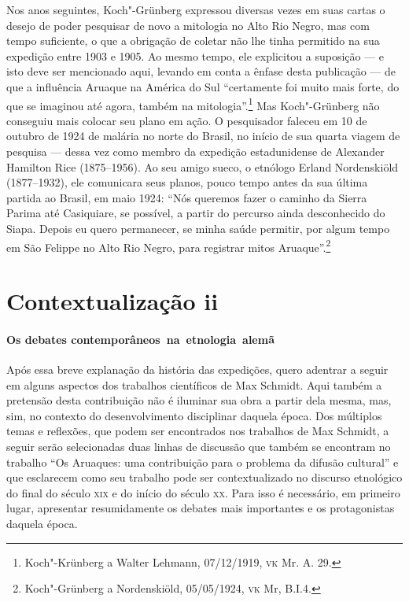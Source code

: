 Nos anos seguintes, Koch"-Grünberg expressou diversas vezes em suas
cartas o desejo de poder pesquisar de novo a mitologia no Alto Rio
Negro, mas com tempo suficiente, o que a obrigação de coletar não lhe
tinha permitido na sua expedição entre 1903 e 1905. Ao mesmo tempo, ele
explicitou a suposição --- e isto deve ser mencionado aqui, levando em
conta a ênfase desta publicação --- de que a influência Aruaque na
América do Sul ``certamente foi muito mais forte, do que se imaginou até
agora, também na mitologia''.\footnote{Koch"-Krünberg a Walter Lehmann,
  07/12/1919, \textsc{vk} Mr. A. 29.} Mas Koch"-Grünberg não conseguiu mais
colocar seu plano em ação. O pesquisador faleceu em 10 de outubro de
1924 de malária no norte do Brasil, no início de sua quarta viagem de
pesquisa --- dessa vez como membro da expedição estadunidense de
Alexander Hamilton Rice (1875--1956). Ao seu amigo sueco, o etnólogo
Erland Nordenskiöld (1877--1932), ele comunicara seus planos, pouco tempo
antes da sua última partida ao Brasil, em maio 1924: ``Nós queremos
fazer o caminho da Sierra Parima até Casiquiare, se possível, a partir
do percurso ainda desconhecido do Siapa. Depois eu quero permanecer, se
minha saúde permitir, por algum tempo em São Felippe no Alto Rio Negro,
para registrar mitos Aruaque''.\footnote{Koch"-Grünberg a Nordenskiöld,
  05/05/1924, \textsc{vk} Mr, B.I.4.}

\section{Contextualização ii}

\paragraph{Os debates contemporâneos~na~etnologia~alemã} Após essa breve explanação da história das expedições, quero adentrar a
seguir em alguns aspectos dos trabalhos científicos de Max Schmidt.
Aqui também a pretensão desta contribuição não é iluminar sua obra a
partir dela mesma, mas, sim, no contexto do desenvolvimento disciplinar
daquela época. Dos múltiplos temas e reflexões, que podem ser
encontrados nos trabalhos de Max Schmidt, a seguir serão selecionadas
duas linhas de discussão que também se encontram no trabalho ``Os
Aruaques: uma contribuição para o problema da difusão cultural'' e que
esclarecem como seu trabalho pode ser contextualizado no discurso
etnológico do final do século \textsc{xix} e do início do século \textsc{xx}. Para isso é
necessário, em primeiro lugar, apresentar resumidamente os debates mais
importantes e os protagonistas daquela época.

